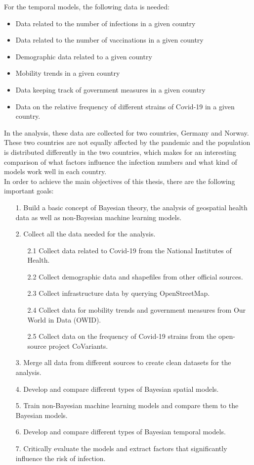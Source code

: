 For the temporal models, the following data is needed:
\begin{itemize}
    \item Data related to the number of infections in a given country
    \item Data related to the number of vaccinations in a given country
    \item Demographic data related to a given country
    \item Mobility trends in a given country
    \item Data keeping track of government measures in a given country
    \item Data on the relative frequency of different strains of Covid-19 in a given country.
\end{itemize}
In the analysis, these data are collected for two countries, Germany and Norway. These two countries are not equally affected by the pandemic and the population is distributed differently in the two countries, which makes for an interesting comparison of what factors influence the infection numbers and what kind of models work well in each country.\\
In order to achieve the main objectives of this thesis, there are the following important goals:
\begin{itemize}
    \item[1.] Build a basic concept of Bayesian theory, the analysis of geospatial health data as well as non-Bayesian machine learning models.
    \item[2.] Collect all the data needed for the analysis.
    \begin{itemize}
    \item[2.1] Collect data related to Covid-19 from the National Institutes of Health.
    \item[2.2] Collect demographic data and shapefiles from other official sources.
    \item[2.3] Collect infrastructure data by querying OpenStreetMap.
    \item[2.4] Collect data for mobility trends and government measures from Our World in Data (OWID).
    \item[2.5] Collect data on the frequency of Covid-19 strains from the open-source project CoVariants.
    \end{itemize}
    \item[3.] Merge all data from different sources to create clean datasets for the analysis.
    \item[4.] Develop and compare different types of Bayesian spatial models.
    \item[5.] Train non-Bayesian machine learning models and compare them to the Bayesian models.
    \item[6.] Develop and compare different types of Bayesian temporal models.
    \item[7.] Critically evaluate the models and extract factors that significantly influence the risk of infection.
\end{itemize}
\clearpage
